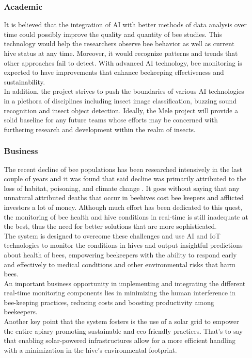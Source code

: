 \documentclass[12pt]{article}
\begin{document}
	\subsubsection{Academic}
	It is believed that the integration of AI with better methods of data analysis over time could possibly improve the quality and quantity of bee studies. This technology would help the researchers observe bee behavior as well as current hive status at any time. Moreover, it would recognize patterns and trends that other approaches fail to detect. With advanced AI technology, bee monitoring is expected to have improvements that enhance beekeeping effectiveness and sustainability.\\ \newline
	In addition, the project strives to push the boundaries of various AI technologies in a plethora of disciplines including insect image classification, buzzing sound recognition and insect object detection. Ideally, the Mele project will provide a solid baseline for any future teams whose efforts may be concerned with furthering research and development within the realm of insects.
	\vspace{0.25 cm}
	
	\subsubsection{Business}
	The recent decline of bee populations has been researched intensively in the last couple of years and it was found that said decline was primarily attributed to the loss of habitat, poisoning, and climate change \cite{rhodes2018pollinator}. It goes without saying that any unnatural attributed deaths that occur in beehives cost bee keepers and afflicted investors a lot of money. Although much effort has been dedicated to this quest, the monitoring of bee health and hive conditions in real-time is still inadequate at the best, thus the need for better solutions that are more sophisticated. \\ \newline
	The system is designed to overcome these challenges and use AI and IoT technologies to monitor the conditions in hives and output insightful predictions about health of bees, empowering beekeepers with the ability to respond early and effectively to medical conditions and other environmental risks that harm bees. \\ \newline
	An important business opportunity in implementing and integrating the different real-time monitoring components lies in minimizing the human interference in bee-keeping practices, reducing costs and boosting productivity among beekeepers.\\ \newline
	Another key point that the system fosters is the use of a solar grid to empower the entire apiary promoting sustainable and eco-friendly practices. That's to say that enabling solar-powered infrastructures allow for a more efficient handling with a minimization in the hive's environmental footprint.
	
\end{document}
